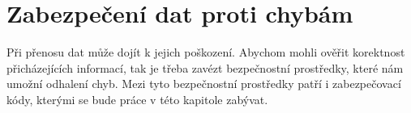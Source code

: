 \chapter{Zabezpečení dat proti chybám}
Při přenosu dat může dojít k jejich poškození. Abychom mohli ověřit korektnost přicházejících informací, tak je třeba zavézt bezpečnostní prostředky, které nám umožní odhalení chyb. Mezi tyto bezpečnostní prostředky patří i zabezpečovací kódy, kterými se bude práce v této kapitole zabývat.

%
%
%




